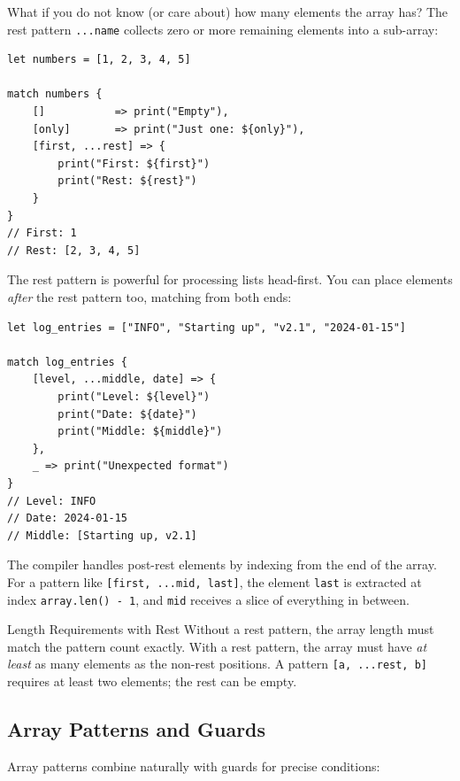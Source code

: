 What if you do not know (or care about) how many elements the array has? The rest pattern \lstinline|...name| collects zero or more remaining elements into a sub-array:

\begin{lstlisting}[language=Lattice, caption={Rest patterns collect remaining elements}]
let numbers = [1, 2, 3, 4, 5]

match numbers {
    []           => print("Empty"),
    [only]       => print("Just one: ${only}"),
    [first, ...rest] => {
        print("First: ${first}")
        print("Rest: ${rest}")
    }
}
// First: 1
// Rest: [2, 3, 4, 5]
\end{lstlisting}

The rest pattern is powerful for processing lists head-first. You can place elements \emph{after} the rest pattern too, matching from both ends:

\begin{lstlisting}[language=Lattice, caption={Rest with trailing elements}]
let log_entries = ["INFO", "Starting up", "v2.1", "2024-01-15"]

match log_entries {
    [level, ...middle, date] => {
        print("Level: ${level}")
        print("Date: ${date}")
        print("Middle: ${middle}")
    },
    _ => print("Unexpected format")
}
// Level: INFO
// Date: 2024-01-15
// Middle: [Starting up, v2.1]
\end{lstlisting}

The compiler handles post-rest elements by indexing from the end of the array. For a pattern like \lstinline|[first, ...mid, last]|, the element \lstinline|last| is extracted at index \lstinline|array.len() - 1|, and \lstinline|mid| receives a slice of everything in between.

\begin{notebox}{Length Requirements with Rest}
Without a rest pattern, the array length must match the pattern count exactly. With a rest pattern, the array must have \emph{at least} as many elements as the non-rest positions. A pattern \lstinline|[a, ...rest, b]| requires at least two elements; the rest can be empty.
\end{notebox}

\subsection{Array Patterns and Guards}\label{sec:array-guards}

Array patterns combine naturally with guards for precise conditions:

